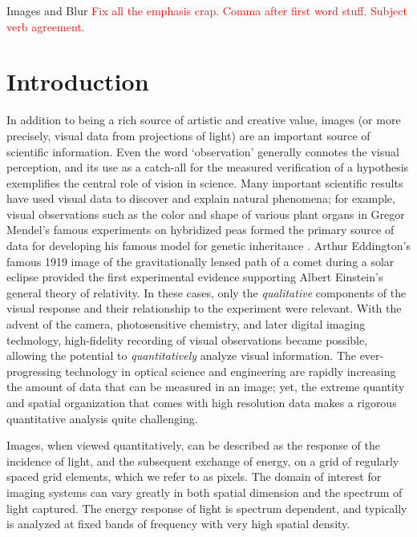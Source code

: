 \setlength{\parindent}{2ex}
\begin{chapter}{Images and Blur}\label{chapter:introduction}
  \textcolor{red}{
   Fix all the emphasis crap.
   Comma after first word stuff.
   Subject verb agreement.
  }
  \section{Introduction}
  In addition to being a rich source of artistic and creative value, images (or more precisely, visual data from projections of light) are an important source of scientific information.
  Even the word `observation' generally connotes the visual perception, and its use as a catch-all for the measured verification of a hypothesis exemplifies the central role of vision in science.
  Many important scientific results have used visual data to discover and explain natural phenomena; for example, visual observations such as the color and shape of various plant organs in Gregor Mendel's famous experiments on hybridized peas formed the primary source of data for developing his famous model for genetic inheritance \citep{magner2002}.
  Arthur Eddington's famous 1919 image of the gravitationally lensed path of a comet during a solar eclipse \citep{eddington1920} provided the first experimental evidence supporting Albert Einstein's general theory of relativity.
  In these cases, only the \emph{qualitative} components of the visual response and their relationship to the experiment were relevant.
  With the advent of the camera, photosensitive chemistry, and later digital imaging technology, high-fidelity recording of visual observations became possible, allowing the potential to \emph{quantitatively} analyze visual information.
  The ever-progressing technology in optical science and engineering are rapidly increasing the amount of data that can be measured in an image; yet, the extreme quantity and spatial organization that comes with high resolution data makes a rigorous quantitative analysis quite challenging.

  Images, when viewed quantitatively, can be described as the response of the incidence of light, and the subsequent exchange of energy, on a grid of regularly spaced grid elements, which we refer to as pixels.
  The domain of interest for imaging systems can vary greatly in both spatial dimension and the spectrum of light captured. 
  The energy response of light is spectrum dependent, and typically is analyzed at fixed bands of frequency with very high spatial density.


\end{chapter}
